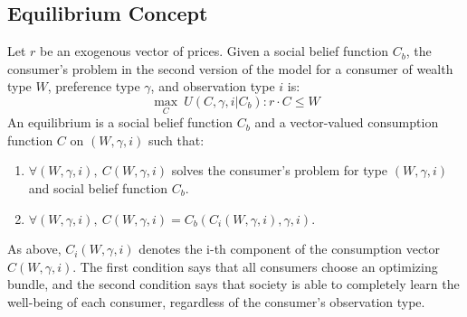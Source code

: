\documentclass{article}
\begin{document}
\subsection{Equilibrium Concept}
Let $r$ be an exogenous vector of prices.  
%
Given a social belief function $C_b$, the consumer's problem in the second version of the model for a consumer of wealth type $W$, preference type $\gamma$, and observation type $i$ is:
\[ \max_C \ U(C,\gamma,i|C_b) :  r\cdot C \le W\]
An equilibrium is a social belief function $C_b$ and a vector-valued consumption function $C$ on $(W,\gamma,i)$ such that:
\begin{enumerate}
	\item $\forall (W,\gamma,i), \ C(W,\gamma,i)$ solves the consumer's problem for type $(W,\gamma,i)$ and social belief function $C_b$.
	\item $\forall (W,\gamma,i), \ C(W,\gamma,i) = C_b(C_i(W,\gamma,i),\gamma,i).$
\end{enumerate}
As above, $C_i(W,\gamma,i)$ denotes the i-th component of the consumption vector $C(W,\gamma,i)$.
The first condition says that all consumers choose an optimizing  bundle, and the second condition says that society is able to completely learn the well-being of each consumer, regardless of the consumer's observation type.
%
\end{document}
